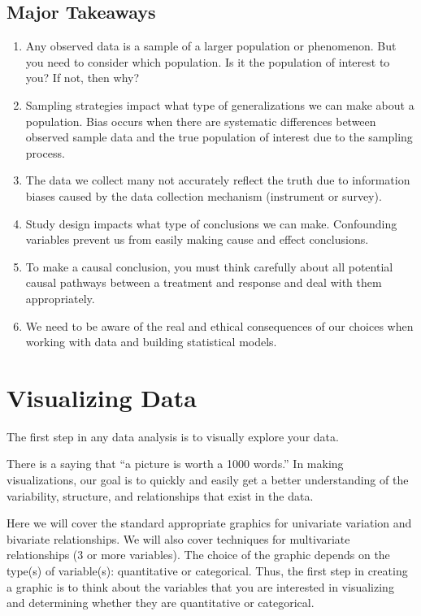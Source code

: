 \documentclass[]{book}
\begin{document}
\hypertarget{major-takeaways}{%
\section{Major Takeaways}\label{major-takeaways}}

\begin{enumerate}
\def\labelenumi{\arabic{enumi}.}
\item
  Any observed data is a sample of a larger population or phenomenon. But you need to consider which population. Is it the population of interest to you? If not, then why?
\item
  Sampling strategies impact what type of generalizations we can make about a population. Bias occurs when there are systematic differences between observed sample data and the true population of interest due to the sampling process.
\item
  The data we collect many not accurately reflect the truth due to information biases caused by the data collection mechanism (instrument or survey).
\item
  Study design impacts what type of conclusions we can make. Confounding variables prevent us from easily making cause and effect conclusions.
\item
  To make a causal conclusion, you must think carefully about all potential causal pathways between a treatment and response and deal with them appropriately.
\item
  We need to be aware of the real and ethical consequences of our choices when working with data and building statistical models.
\end{enumerate}

\hypertarget{visualizing-data}{%
\chapter{Visualizing Data}\label{visualizing-data}}

The first step in any data analysis is to visually explore your data.

There is a saying that ``a picture is worth a 1000 words.'' In making visualizations, our goal is to quickly and easily get a better understanding of the variability, structure, and relationships that exist in the data.

Here we will cover the standard appropriate graphics for univariate variation and bivariate relationships. We will also cover techniques for multivariate relationships (3 or more variables). The choice of the graphic depends on the type(s) of variable(s): quantitative or categorical. Thus, the first step in creating a graphic is to think about the variables that you are interested in visualizing and determining whether they are quantitative or categorical.
\end{document}
